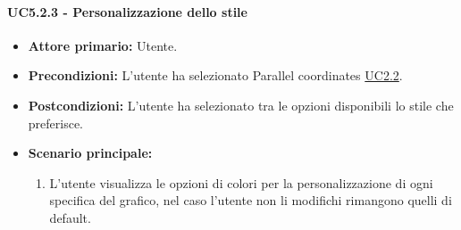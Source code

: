 \paragraph{UC5.2.3 - Personalizzazione dello stile}
\label{sec:UC5.2.3}
    \begin{itemize}
        \item \textbf{Attore primario:} Utente.
        \item \textbf{Precondizioni:} L'utente ha selezionato Parallel coordinates \hyperref[sec:UC2.2]{UC2.2}.
	    \item \textbf{Postcondizioni:} L'utente ha selezionato tra le opzioni disponibili lo stile che preferisce.
	    \item \textbf{Scenario principale:} 
	    \begin{enumerate}
	    		\item L'utente visualizza le opzioni di colori per la personalizzazione di ogni specifica del grafico, nel caso l'utente non li modifichi rimangono quelli di default.
		\end{enumerate}
    \end{itemize}


\newpage
